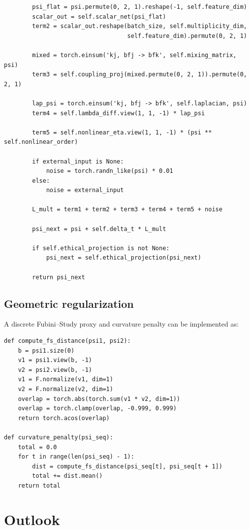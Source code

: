 \documentclass[11pt]{article}
\begin{document}
\begin{verbatim}
        psi_flat = psi.permute(0, 2, 1).reshape(-1, self.feature_dim)
        scalar_out = self.scalar_net(psi_flat)
        term2 = scalar_out.reshape(batch_size, self.multiplicity_dim,
                                   self.feature_dim).permute(0, 2, 1)

        mixed = torch.einsum('kj, bfj -> bfk', self.mixing_matrix, psi)
        term3 = self.coupling_proj(mixed.permute(0, 2, 1)).permute(0, 2, 1)

        lap_psi = torch.einsum('kj, bfj -> bfk', self.laplacian, psi)
        term4 = self.lambda_diff.view(1, 1, -1) * lap_psi

        term5 = self.nonlinear_eta.view(1, 1, -1) * (psi ** self.nonlinear_order)

        if external_input is None:
            noise = torch.randn_like(psi) * 0.01
        else:
            noise = external_input

        L_mult = term1 + term2 + term3 + term4 + term5 + noise

        psi_next = psi + self.delta_t * L_mult

        if self.ethical_projection is not None:
            psi_next = self.ethical_projection(psi_next)

        return psi_next
\end{verbatim}

\subsection{Geometric regularization}

A discrete Fubini--Study proxy and curvature penalty can be implemented as:

\begin{verbatim}
def compute_fs_distance(psi1, psi2):
    b = psi1.size(0)
    v1 = psi1.view(b, -1)
    v2 = psi2.view(b, -1)
    v1 = F.normalize(v1, dim=1)
    v2 = F.normalize(v2, dim=1)
    overlap = torch.abs(torch.sum(v1 * v2, dim=1))
    overlap = torch.clamp(overlap, -0.999, 0.999)
    return torch.acos(overlap)

def curvature_penalty(psi_seq):
    total = 0.0
    for t in range(len(psi_seq) - 1):
        dist = compute_fs_distance(psi_seq[t], psi_seq[t + 1])
        total += dist.mean()
    return total
\end{verbatim}

\section{Outlook}
\end{document}
